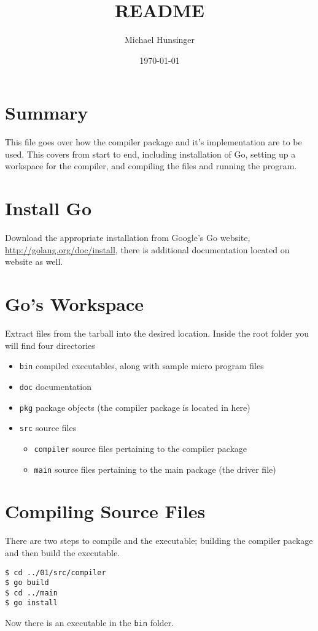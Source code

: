 \documentclass[11pt]{article}
\author{Michael Hunsinger}
\date{\today}
\title{README}
\begin{document}
\maketitle

\section{Summary}
\label{sec-1}
This file goes over how the compiler package and it's implementation are to be
used. This covers from start to end, including installation of Go, setting up
a workspace for the compiler, and compiling the files and running the program.

\section{Install Go}
\label{sec-2}
Download the appropriate installation from Google's Go website,
\url{http://golang.org/doc/install}, there is additional documentation located
on website as well.

\section{Go's Workspace}
\label{sec-3}
Extract files from the tarball into the desired location. Inside the root
folder you will find four directories
\begin{itemize}
\item \texttt{bin} compiled executables, along with sample micro program files
\item \texttt{doc} documentation
\item \texttt{pkg} package objects (the compiler package is located in here)
\item \texttt{src} source files
\begin{itemize}
\item \texttt{compiler} source files pertaining to the compiler package
\item \texttt{main} source files pertaining to the main package (the driver file)
\end{itemize}
\end{itemize}

\section{Compiling Source Files}
\label{sec-4}
There are two steps to compile and the executable; building the compiler
package and then build the executable.
\begin{verbatim}
$ cd ../01/src/compiler
$ go build
$ cd ../main
$ go install
\end{verbatim}
Now there is an executable in the \texttt{bin} folder.
\end{document}
